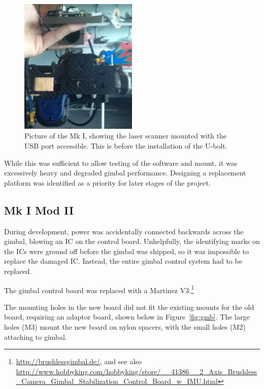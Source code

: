 \documentclass[12pt,oneside,a4paper]{book}
\begin{document}
\begin{figure}[h!]
  \centering
  \includegraphics[width=0.5\textwidth]{figs/mk1-mount}
  \caption{Picture of the Mk I, showing the laser scanner mounted with the USB port accessible. This is before the installation of the U-bolt.}
  \label{fig:mk1-mount}
\end{figure}

While this was sufficient to allow testing of the software and mount,
it was excessively heavy and degraded gimbal performance. Designing a
replacement platform was identified as a priority for later stages of the project.

\subsection{Mk I Mod II}
\label{sec:mk-ib}

During development, power was accidentally connected backwards across
the gimbal, blowing an IC on the control board. Unhelpfully, the
identifying marks on the ICs were ground off before the gimbal was
shipped, so it was impossible to replace the damaged IC. Instead, the
entire gimbal control system had to be replaced.

The gimbal control board was replaced with a Martinez
V3.\footnote{\url{http://brushlessgimbal.de/}, and see also \url{http://www.hobbyking.com/hobbyking/store/__41386__2_Axis_Brushless_Camera_Gimbal_Stabilization_Control_Board_w_IMU.html}}

The mounting holes in the new board did not fit the existing
mounts for the old board, requiring an adaptor board, shown below in
Figure~\ref{fig:gmb}. The large holes (M3) mount the new board on
nylon spacers, with the small holes (M2) attaching to gimbal.
\end{document}
